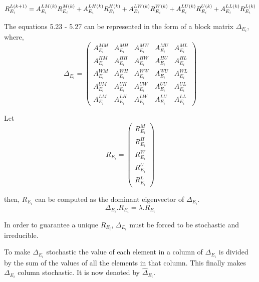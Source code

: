 \begin{equation}
\small R_{{E_{i}}}^{L(k+1)} = A_{E_{i}}^{LM(k)}R_{{E_{i}}}^{M(k)} + A_{E_{i}}^{LH(k)}R_{{E_{i}}}^{H(k)} +A_{E_{i}}^{LW(k)}R_{{E_{i}}}^{W(k)}+ A_{E_{i}}^{LU(k)}R_{{E_{i}}}^{U(k)}+ A_{E_{i}}^{LL(k)}R_{{E_{i}}}^{L(k)}
\end{equation}


The equations 5.23 - 5.27 can be represented in the form of a block matrix $\Delta_{E_{i}}$, where,
\[ \Delta_{E_{i}} = \left( \begin{array}{ccccc}
A_{E_{i}}^{MM} & A_{E_{i}}^{MH} & A_{E_{i}}^{MW} &  A_{E_{i}}^{MU} & A_{E_{i}}^{ML} \\
A_{E_{i}}^{HM} & A_{E_{i}}^{HH} & A_{E_{i}}^{HW} & A_{E_{i}}^{HU} & A_{E_{i}}^{HL} \\
A_{E_{i}}^{WM} & A_{E_{i}}^{WH} & A_{E_{i}}^{WW} & A_{E_{i}}^{WU} & A_{E_{i}}^{WL}\\
A_{E_{i}}^{UM} & A_{E_{i}}^{UH} & A_{E_{i}}^{UW} & A_{E_{i}}^{UU} & A_{E_{i}}^{UL} \\
A_{E_{i}}^{LM} & A_{E_{i}}^{LH} & A_{E_{i}}^{LW} & A_{E_{i}}^{LU} & A_{E_{i}}^{LL} \end{array} \right)\] 

Let \[R_{E_{i}} = \left( \begin{array}{c}
R_{{E_{i}}}^{M} \\
R_{{E_{i}}}^{H} \\
R_{{E_{i}}}^{W} \\
R_{{E_{i}}}^{U} \\
R_{{E_{i}}}^{L} \end{array} \right)\] 

then, $R_{E_{i}}$ can be computed as the dominant eigenvector of $\Delta_{E_{i}}$.
\begin{equation}
\Delta_{E_{i}}.R_{E_{i}} = \lambda.R_{E_{i}}
\end{equation}

In order to guarantee a unique $R_{E_{i}}$, $\Delta_{E_{i}}$ must be forced to be stochastic and irreducible. 

To make $\Delta_{E_{i}}$ stochastic the value of each element in a column of $\Delta_{E_{i}}$ is divided by the sum of the values of all the elements in that column. This finally makes $\Delta_{E_{i}}$ column stochastic. It is now denoted by $\hat \Delta_{E_{i}}$.

